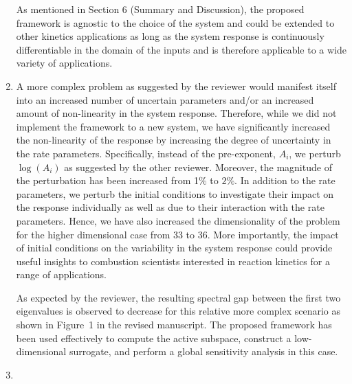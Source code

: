 \documentclass[11pt,final]{article}
\newcommand{\referee}[1]{\vspace{.1ex}\noindent{\textcolor{blue}{#1}}}
\begin{document}
\begin{enumerate}[wide, labelwidth=!, labelindent=0pt]
As mentioned in Section 6
(Summary and Discussion), the proposed framework is agnostic to the choice of the system and could be extended
to other kinetics applications as long as the system response is continuously differentiable in the domain of
the inputs and is therefore applicable to a wide variety of applications.    

\item \referee{Related to 1) above, it is of paramount importance that the authors consider, at least, 
methane, for which I expect less of a spectral gap in the matrix C. Ideally, more complex fuels with 
more nuanced responses.
In other words, if the method works well for a simple case, what is its value to the community?
The authors must try this out on a much more complex hydrocarbon/oxygen system.}

A more complex problem as suggested by the reviewer would manifest itself into an increased number of
uncertain parameters and/or an increased amount of non-linearity in the system response. Therefore, while
we did not implement the framework to a new system, we have significantly increased the non-linearity of the
response by increasing the degree of uncertainty in the rate parameters. Specifically, instead of
the pre-exponent, $A_i$, we perturb $\log(A_i)$ as suggested by the other reviewer. Moreover, 
the magnitude of the perturbation has been increased from 1$\%$ to $2\%$.
In addition to the rate parameters,
we perturb the initial conditions to investigate their impact on the response individually as well as due to
their interaction with the rate parameters. Hence, we have also increased the dimensionality of the problem
for the higher dimensional case from 33 to 36. More importantly, the impact of initial conditions on the
variability in the system response could provide useful insights to combustion scientists interested in 
reaction kinetics for a range of applications.

As expected by the reviewer, the resulting spectral gap between the first two eigenvalues is observed to
decrease for this relative more complex scenario as shown in Figure~1 in the revised manuscript. 
The proposed framework has been used effectively to compute the active subspace, construct a low-dimensional
surrogate, and perform a global sensitivity analysis in this case. 

\item \referee{The authors report ignition delay times of 0.1 s (?). See for example Fig. 7 and Tab. 2.
Are these seconds (s)? If this is the case, what kind of conditions (temperature/pressure/stoichiometry)
are the authors considering? They seem very unphysical if the yield an ignition delay time of O(0.1 s).
I could not find any clarification of the initial conditions for the ignition calculations.
This is again a symptom of the disconnect between the authors' aims (a novel method, potentially very useful to the combustion community) and the combustion community's aims (more understanding and tools that can be of help in combustion kinetics).}


\end{enumerate}
\end{document}
